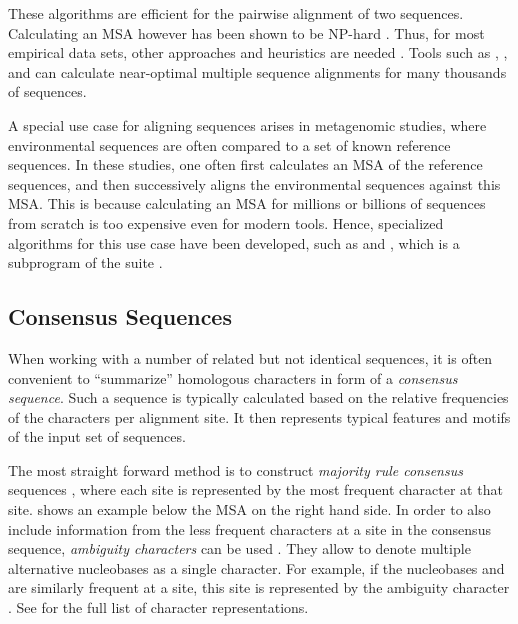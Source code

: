 These algorithms are efficient for the pairwise alignment of two sequences.
Calculating an MSA however has been shown to be NP-hard \cite{Wang1994,Just2001}.
Thus, for most empirical data sets, other approaches and heuristics are needed \cite{Thompson2011}.
Tools such as  \cite{Higgins1988},  \cite{Edgar2004}, and  \cite{Katoh2002}
can calculate near-optimal multiple sequence alignments for many thousands of sequences.

A special use case for aligning sequences arises in metagenomic studies,
where environmental sequences are often compared to a set of known reference sequences.
In these studies, one often first calculates an MSA of the reference sequences,
and then successively aligns the environmental sequences against this MSA.
This is because calculating an MSA for millions or billions of sequences from scratch is too expensive even for modern tools.
Hence, specialized algorithms for this use case have been developed,
such as  \citep{Berger2011a,Berger2012} and
, which is a subprogram of the  suite \citep{Eddy1998,Eddy2009}.


\subsection{Consensus Sequences}
\label{ch:Foundations:sec:SequenceAnalysis:sub:ConsensusSequences}

When working with a number of related but not identical sequences,
it is often convenient to ``summarize'' homologous characters in form of a \emph{consensus sequence}.
Such a sequence is typically calculated based on the relative frequencies of the characters per alignment site.
It then represents typical features and motifs of the input set of sequences.

The most straight forward method is to construct \emph{majority rule consensus} sequences \citep{May1952,Day1992a},
where each site is represented by the most frequent character at that site.
 shows an example below the MSA on the right hand side.
In order to also include information from the less frequent characters at a site in the consensus sequence,
\emph{ambiguity characters} can be used \cite{IUPAC1970}.
They allow to denote multiple alternative nucleobases as a single character.
For example, if the nucleobases  and  are similarly frequent at a site,
this site is represented by the ambiguity character .
See  for the full list of character representations.

